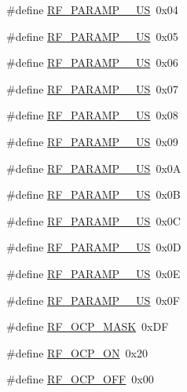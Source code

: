 \begin{DoxyCompactItemize}
\item 
\#define \mbox{\hyperlink{sx1276_regs-_fsk_8h_ac09b8ab8fd2f894cff3f4ff744fc6afe}{R\+F\+\_\+\+P\+A\+R\+A\+M\+P\+\_\+\_\+\+US}}~0x04
\item 
\#define \mbox{\hyperlink{sx1276_regs-_fsk_8h_a503450550b5adc6b1a90f669560ce6e3}{R\+F\+\_\+\+P\+A\+R\+A\+M\+P\+\_\+\_\+\+US}}~0x05
\item 
\#define \mbox{\hyperlink{sx1276_regs-_fsk_8h_ab6436b7008237e768430e4341f3690c2}{R\+F\+\_\+\+P\+A\+R\+A\+M\+P\+\_\+\_\+\+US}}~0x06
\item 
\#define \mbox{\hyperlink{sx1276_regs-_fsk_8h_afdbd878cf8d71fc7847839ede51befcf}{R\+F\+\_\+\+P\+A\+R\+A\+M\+P\+\_\+\_\+\+US}}~0x07
\item 
\#define \mbox{\hyperlink{sx1276_regs-_fsk_8h_ac822b78122be23759c44a0ea4bafcee8}{R\+F\+\_\+\+P\+A\+R\+A\+M\+P\+\_\+\_\+\+US}}~0x08
\item 
\#define \mbox{\hyperlink{sx1276_regs-_fsk_8h_a8bf30d2871eb23126fcf129bc33e865d}{R\+F\+\_\+\+P\+A\+R\+A\+M\+P\+\_\+\_\+\+US}}~0x09
\item 
\#define \mbox{\hyperlink{sx1276_regs-_fsk_8h_ac52043271b89e70323e72d1075f0b6fe}{R\+F\+\_\+\+P\+A\+R\+A\+M\+P\+\_\+\_\+\+US}}~0x0A
\item 
\#define \mbox{\hyperlink{sx1276_regs-_fsk_8h_ad0dfe13e76f88d7ded3c3ef508d4d2ae}{R\+F\+\_\+\+P\+A\+R\+A\+M\+P\+\_\+\_\+\+US}}~0x0B
\item 
\#define \mbox{\hyperlink{sx1276_regs-_fsk_8h_a321fde6a82d665cb174086f7d532eff8}{R\+F\+\_\+\+P\+A\+R\+A\+M\+P\+\_\+\_\+\+US}}~0x0C
\item 
\#define \mbox{\hyperlink{sx1276_regs-_fsk_8h_a035bf0812a1b3171b3ca7ccebfe71deb}{R\+F\+\_\+\+P\+A\+R\+A\+M\+P\+\_\+\_\+\+US}}~0x0D
\item 
\#define \mbox{\hyperlink{sx1276_regs-_fsk_8h_abca7fd114ba58b4640c3662519e2c713}{R\+F\+\_\+\+P\+A\+R\+A\+M\+P\+\_\+\_\+\+US}}~0x0E
\item 
\#define \mbox{\hyperlink{sx1276_regs-_fsk_8h_a7863d94d5d9cbd4b3fa8ba21da2c1d2d}{R\+F\+\_\+\+P\+A\+R\+A\+M\+P\+\_\+\_\+\+US}}~0x0F
\item 
\#define \mbox{\hyperlink{sx1276_regs-_fsk_8h_a647861589ac95c5f1dc957e8050efd1c}{R\+F\+\_\+\+O\+C\+P\+\_\+\+M\+A\+SK}}~0x\+DF
\item 
\#define \mbox{\hyperlink{sx1276_regs-_fsk_8h_a88bfe34637e386be3c38ce7ff1a9eed1}{R\+F\+\_\+\+O\+C\+P\+\_\+\+ON}}~0x20
\item 
\#define \mbox{\hyperlink{sx1276_regs-_fsk_8h_adcad32407684d268946ce3928213a966}{R\+F\+\_\+\+O\+C\+P\+\_\+\+O\+FF}}~0x00

\end{DoxyCompactItemize}
